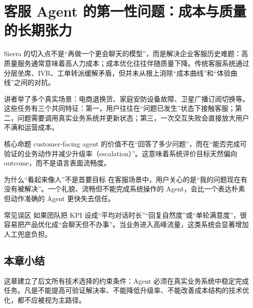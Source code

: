 \section{客服 Agent 的第一性问题：成本与质量的长期张力}

Sierra 的切入点不是“再做一个更会聊天的模型”，而是解决企业客服历史难题：高质量服务通常意味着高人力成本；成本优化往往伴随质量下降。传统客服系统通过分层坐席、IVR、工单转派缓解矛盾，但并未从根上消除“成本曲线”和“体验曲线”之间的对抗。

讲者举了多个真实场景：电商退换货、家庭安防设备故障、卫星广播订阅切换等。这些任务有三个共同特征：第一，用户往往在“问题已发生”状态下接触客服；第二，问题需要调用真实业务系统并更新状态；第三，一次交互失败会直接放大用户不满和运营成本。

\begin{importantbox}{核心命题}
customer-facing agent 的价值不在“回答了多少问题”，而在“能否完成可验证的业务动作并减少升级率（escalation）”。这意味着系统评价目标天然偏向 outcome，而不是语言表面流畅度。
\end{importantbox}

\begin{knowledgebox}{为什么“看起来像人”不是首要目标}
在客服场景中，用户关心的是“我的问题现在有没有被解决”。一个礼貌、流畅但不能完成系统操作的 Agent，会比一个表达朴素但动作准确的 Agent 更快失去信任。
\end{knowledgebox}

\begin{warningbox}{常见误区}
如果团队把 KPI 设成“平均对话时长”“回复自然度”或“单轮满意度”，很容易把产品优化成“会聊天但不办事”。当业务进入高峰流量，这类系统会显著增加人工兜底负担。
\end{warningbox}

\subsection{本章小结}

这章建立了后文所有技术选择的约束条件：Agent 必须在真实业务系统中稳定完成任务。凡是不能提高可验证解决率、不能降低升级率、不能改善成本结构的技术优化，都不应被视为主路径。

